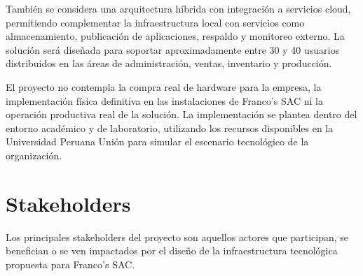 \documentclass[11pt, a4paper, oneside]{report}
\begin{document}
También se considera una arquitectura híbrida con integración a servicios cloud, permitiendo complementar la infraestructura local con servicios como almacenamiento, publicación de aplicaciones, respaldo y monitoreo externo. La solución será diseñada para soportar aproximadamente entre 30 y 40 usuarios distribuidos en las áreas de administración, ventas, inventario y producción.

El proyecto no contempla la compra real de hardware para la empresa, la implementación física definitiva en las instalaciones de Franco's SAC ni la operación productiva real de la solución. La implementación se plantea dentro del entorno académico y de laboratorio, utilizando los recursos disponibles en la Universidad Peruana Unión para simular el escenario tecnológico de la organización.
\section{Stakeholders}
Los principales stakeholders del proyecto son aquellos actores que participan, se benefician o se ven impactados por el diseño de la infraestructura tecnológica propuesta para Franco's SAC.
\end{document}

